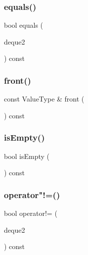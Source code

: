 \mbox{\label{classDeque_a2468abeaef57d95b43a90b7462ff88ab}} 
\subsubsection{\texorpdfstring{equals()}{equals()}}
{\footnotesize\ttfamily bool equals (\begin{DoxyParamCaption}\item[{const \mbox{\hyperlink{classDeque}{Deque}}$<$ Value\+Type $>$ \&}]{deque2 }\end{DoxyParamCaption}) const}

\mbox{\label{classDeque_a02aaa52ad7a120201f6dd3e90eff737f}} 
\subsubsection{\texorpdfstring{front()}{front()}}
{\footnotesize\ttfamily const Value\+Type \& front (\begin{DoxyParamCaption}{ }\end{DoxyParamCaption}) const}

\mbox{\label{classDeque_acf82f9b2937375c7b1cf3dccb3df3312}} 
\subsubsection{\texorpdfstring{is\+Empty()}{isEmpty()}}
{\footnotesize\ttfamily bool is\+Empty (\begin{DoxyParamCaption}{ }\end{DoxyParamCaption}) const}

\mbox{\label{classDeque_a512bc8214fed49868d85acd8f1e351d3}} 
\subsubsection{\texorpdfstring{operator"!=()}{operator!=()}}
{\footnotesize\ttfamily bool operator!= (\begin{DoxyParamCaption}\item[{const \mbox{\hyperlink{classDeque}{Deque}}$<$ Value\+Type $>$ \&}]{deque2 }\end{DoxyParamCaption}) const}

